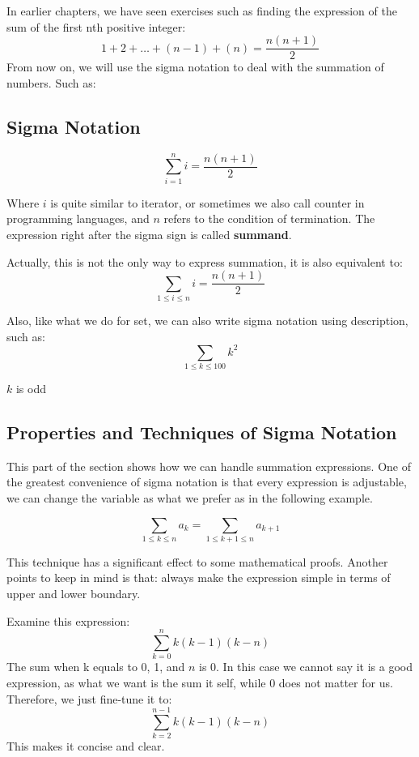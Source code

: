 \documentclass[
	12pt, %
	fleqn, %
	a4paper, %
]{LegrandOrangeBook}
\begin{document}
In earlier chapters, we have seen exercises such as finding the expression of the sum of the first nth positive integer:
$$1 + 2 + \dots + (n-1) + (n)= \frac{n(n+1)}{2}$$ 
From now on, we will use the sigma notation to deal with the summation of numbers. Such as:
\subsection{Sigma Notation}
\begin{notation}
    \[
\sum_{i=1}^{n} i = \frac{n(n + 1)}{2}
    \]
\end{notation}
Where $i$ is quite similar to iterator, or sometimes we also call counter in programming languages, and $n$ refers to the condition of termination. The expression right after the sigma sign is called \textbf{summand}.

Actually, this is not the only way to express summation, it is also equivalent to:
\[\sum_{1\leq i\leq n} i = \frac{n(n+1)}{2}\]

Also, like what we do for set, we can also write sigma notation using description, such as: 
\[
\sum_{1 \leq k \leq 100} k^2
\]

\( k \) is odd

\subsection{Properties and Techniques of Sigma Notation}
This part of the section shows how we can handle summation expressions.
One of the greatest convenience of sigma notation is that every expression is adjustable, we can change the variable as what we prefer as in the following example.
\begin{example} \label{exp:siginvariance}
 \[
\sum_{1 \leq k \leq n} a_k = \sum_{1 \leq k+1 \leq n} a_{k+1}
\]
\end{example}
This technique has a significant effect to some mathematical proofs.
Another points to keep in mind is that: always make the expression simple in terms of upper and lower boundary.
\begin{example}
    Examine this expression: 
    \[\sum_{k=0}^{n} k(k-1)(k-n)\]
    The sum when k equals to 0, 1, and $n$ is 0. In this case we cannot say it is a good expression, as what we want is the sum it self, while 0 does not matter for us. Therefore, we just fine-tune it to:
    \[\sum_{k=2}^{n-1} k(k-1)(k-n)\]
    This makes it concise and clear.
\end{example}
\end{document}
